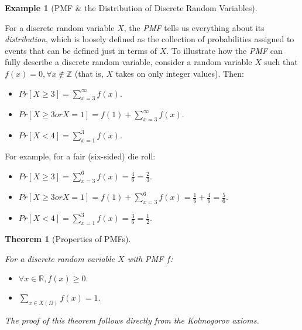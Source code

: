 \documentclass[
]{article}
\providecommand{\tightlist}{%
  \setlength{\itemsep}{0pt}\setlength{\parskip}{0pt}}
\newtheorem{theorem}{Theorem}[section]
\theoremstyle{definition}
\theoremstyle{definition}
\newtheorem{example}{Example}[section]
\theoremstyle{definition}
\theoremstyle{remark}
\begin{document}
\begin{example}[PMF & the Distribution of Discrete Random Variables]
\protect\hypertarget{exm:unlabeled-div-25}{}\label{exm:unlabeled-div-25}

For a discrete random variable \(X\), the \emph{PMF} tells us everything about its \emph{distribution}, which is loosely defined as the collection of probabilities assigned to events that can be defined just in terms of \(X\). To illustrate how the \emph{PMF} can fully describe a discrete random variable, consider a random variable \(X\) such that \(f(x) = 0, \forall x \notin \mathbb{Z}\) (that is, \(X\) takes on only integer values). Then:

\begin{itemize}
\tightlist
\item
  \(Pr[X \geq 3] = \sum_{x=3}^{\infty}f(x).\)
\item
  \(Pr[X \geq 3 or X = 1] = f(1) + \sum_{x=3}^{\infty}f(x).\)
\item
  \(Pr[X < 4] = \sum_{x=1}^{3}f(x).\)
\end{itemize}

For example, for a fair (six-sided) die roll:

\begin{itemize}
\tightlist
\item
  \(Pr[X \geq 3] = \sum_{x=3}^{6}f(x) = \frac{4}{6} = \frac{2}{3}.\)
\item
  \(Pr[X \geq 3 or X = 1] = f(1) + \sum_{x=3}^{6}f(x) = \frac{1}{6} + \frac{4}{6} = \frac{5}{6}.\)
\item
  \(Pr[X < 4] = \sum_{x=1}^{3}f(x) = \frac{3}{6} = \frac{1}{2}.\)
\end{itemize}

\end{example}

\begin{theorem}[Properties of PMFs]
\protect\hypertarget{thm:unlabeled-div-26}{}\label{thm:unlabeled-div-26}

For a discrete random variable \(X\) with \emph{PMF} \(f\):

\begin{itemize}
\tightlist
\item
  \(\forall x \in \mathbb{R}, f(x) \geq 0.\)
\item
  \(\sum_{x \in X(\Omega)}f(x) = 1.\)
\end{itemize}

The proof of this theorem follows directly from the \emph{Kolmogorov axioms}.

\end{theorem}
\end{document}
